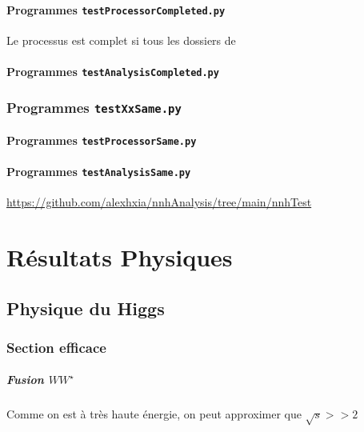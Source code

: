 \documentclass[10pt,a4paper]{report}
\newcommand{\Wstar}{W^{\star}}
\begin{document}
\subsubsection{Programmes \texttt{testProcessorCompleted.py}}

Le processus est complet si tous les dossiers de 

\subsubsection{Programmes \texttt{testAnalysisCompleted.py}}


\subsection{Programmes \texttt{testXxSame.py}}

\subsubsection{Programmes \texttt{testProcessorSame.py}}

\subsubsection{Programmes \texttt{testAnalysisSame.py}}



\url{https://github.com/alexhxia/nnhAnalysis/tree/main/nnhTest}


\chapter{Résultats Physiques}

\section{Physique du Higgs}

\subsection{Section efficace}

\paragraph{Fusion $W\Wstar$ \cite{desy}}

Comme on est à très haute énergie, on peut approximer que $ \sqrt{s} >> 2 $
\end{document}
